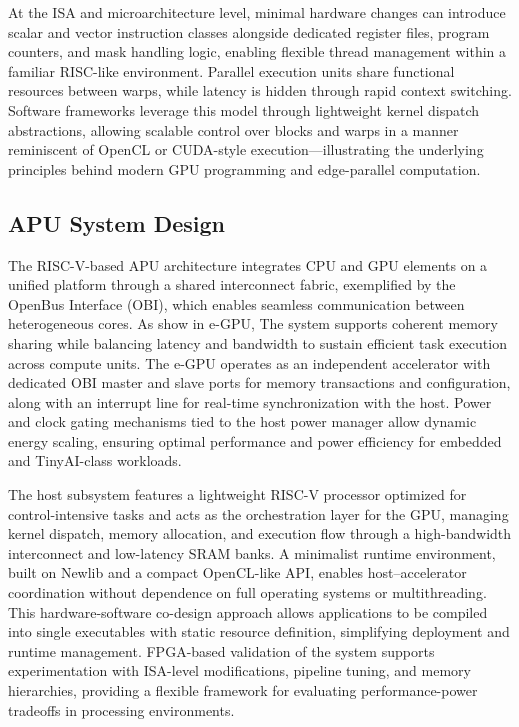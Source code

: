 \documentclass[conference]{IEEEtran}
\begin{document}
At the ISA and microarchitecture level, minimal hardware changes can introduce scalar and vector instruction classes alongside dedicated register files, program counters, and mask handling logic, enabling flexible thread management within a familiar RISC-like environment. Parallel execution units share functional resources between warps, while latency is hidden through rapid context switching. Software frameworks leverage this model through lightweight kernel dispatch abstractions, allowing scalable control over blocks and warps in a manner reminiscent of OpenCL or CUDA-style execution—illustrating the underlying principles behind modern GPU programming and edge-parallel computation.

\subsection{APU System Design}

The RISC-V-based APU architecture integrates CPU and GPU elements on a unified platform through a shared interconnect fabric, exemplified by the OpenBus Interface (OBI), which enables seamless communication between heterogeneous cores. As show in e-GPU, The system supports coherent memory sharing while balancing latency and bandwidth to sustain efficient task execution across compute units. The e-GPU operates as an independent accelerator with dedicated OBI master and slave ports for memory transactions and configuration, along with an interrupt line for real-time synchronization with the host. Power and clock gating mechanisms tied to the host power manager allow dynamic energy scaling, ensuring optimal performance and power efficiency for embedded and TinyAI-class workloads.

The host subsystem features a lightweight RISC-V processor optimized for control-intensive tasks and acts as the orchestration layer for the GPU, managing kernel dispatch, memory allocation, and execution flow through a high-bandwidth interconnect and low-latency SRAM banks. A minimalist runtime environment, built on Newlib and a compact OpenCL-like API, enables host–accelerator coordination without dependence on full operating systems or multithreading. This hardware-software co-design approach allows applications to be compiled into single executables with static resource definition, simplifying deployment and runtime management. FPGA-based validation of the system supports experimentation with ISA-level modifications, pipeline tuning, and memory hierarchies, providing a flexible framework for evaluating performance-power tradeoffs in processing environments.
\end{document}
